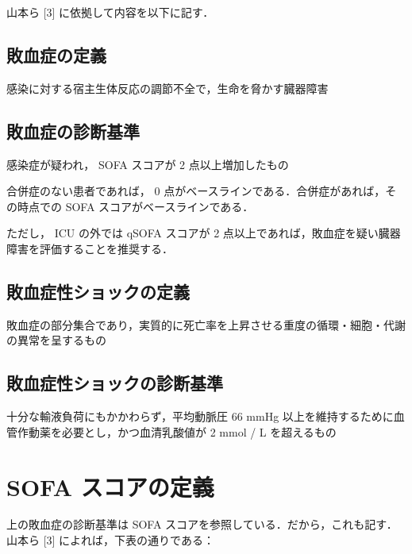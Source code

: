 \documentclass[10pt,uplatex]{jsarticle}
\begin{document}
山本ら [3] に依拠して内容を以下に記す．

\subsection{敗血症の定義}

感染に対する宿主生体反応の調節不全で，生命を脅かす臓器障害

\subsection{敗血症の診断基準}

感染症が疑われ， SOFA スコアが 2 点以上増加したもの

合併症のない患者であれば， 0 点がベースラインである．合併症があれば，その時点での SOFA スコアがベースラインである．

ただし， ICU の外では qSOFA スコアが 2 点以上であれば，敗血症を疑い臓器障害を評価することを推奨する．



\subsection{敗血症性ショックの定義}

敗血症の部分集合であり，実質的に死亡率を上昇させる重度の循環・細胞・代謝の異常を呈するもの

\subsection{敗血症性ショックの診断基準}

十分な輸液負荷にもかかわらず，平均動脈圧 66 mmHg 以上を維持するために血管作動薬を必要とし，かつ血清乳酸値が 2 mmol / L を超えるもの

\section{SOFA スコアの定義}

上の敗血症の診断基準は SOFA スコアを参照している．だから，これも記す．山本ら [3] によれば，下表の通りである：
\end{document}
